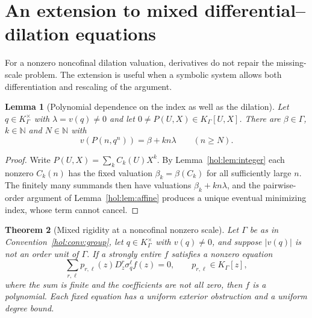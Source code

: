 \documentclass[11pt]{article}
\numberwithin{equation}{section}
\newtheorem{theorem}{Theorem}[section]
\newtheorem{lemma}[theorem]{Lemma}
\theoremstyle{definition}
\theoremstyle{remark}
\newcommand{\N}{\mathbb N}
\newcommand{\K}{K_\Gamma}
\newcommand{\abs}[1]{\lvert#1\rvert}
\begin{document}
\section{An extension to mixed differential--dilation equations}
\label{hol:sec:mixed}

For a nonzero noncofinal dilation valuation, derivatives do not repair the
missing-scale problem. The extension is useful when a symbolic system allows
both differentiation and rescaling of the argument.

\begin{lemma}[Polynomial dependence on the index as well as the dilation]
\label{hol:lem:bivariate}
Let $q\in\K^\times$ with $\lambda=v(q)\ne0$ and let
$0\ne P(U,X)\in\K[U,X]$. There are $\beta\in\Gamma$, $k\in\N$ and $N\in\N$
with
\[
 v(P(n,q^n))=\beta+kn\lambda\qquad(n\ge N).
\]
\end{lemma}

\begin{proof}
Write $P(U,X)=\sum_kC_k(U)X^k$. By Lemma~\ref{hol:lem:integer} each nonzero
$C_k(n)$ has the fixed valuation $\beta_k=\beta(C_k)$ for all sufficiently
large $n$. The finitely many summands then have valuations
$\beta_k+kn\lambda$, and the pairwise-order argument of
Lemma~\ref{hol:lem:affine} produces a unique eventual minimizing index, whose
term cannot cancel.
\end{proof}

\begin{theorem}[Mixed rigidity at a noncofinal nonzero scale]
\label{hol:thm:mixed}
Let $\Gamma$ be as in Convention~\ref{hol:conv:group}, let $q\in\K^\times$
with $v(q)\ne0$, and suppose $\abs{v(q)}$ is not an order unit of $\Gamma$. If
a strongly entire $f$ satisfies a nonzero equation
\begin{equation}\label{hol:eq:mixed}
 \sum_{r,\ell}p_{r,\ell}(z)D_z^r\sigma_q^\ell f(z)=0,\qquad p_{r,\ell}\in\K[z],
\end{equation}
where the sum is finite and the coefficients are not all zero, then $f$ is a
polynomial. Each fixed equation has a uniform exterior obstruction and a
uniform degree bound.
\end{theorem}
\end{document}
